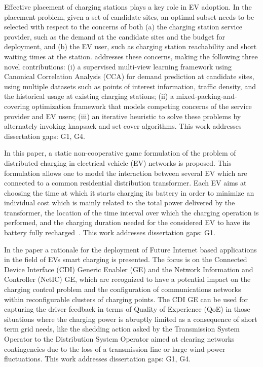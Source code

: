 \documentclass[letterpaper, 12pt, oneside, doublespacing]{Thesis}
\begin{document}
\noindent Effective placement of charging stations plays a key role in EV adoption. In the placement problem, given a set of candidate sites, an optimal subset needs to be selected with respect to the concerns of both (a) the charging station service provider, such as the demand at the candidate sites and the budget for deployment, and (b) the EV user, such as charging station reachability and short waiting times at the station. \cite{demand_prediction_2016} addresses these concerns, making the following three novel contributions: (i) a supervised multi-view learning framework using Canonical Correlation Analysis (CCA) for demand prediction at candidate sites, using multiple datasets such as points of interest information, traffic density, and the historical usage at existing charging stations; (ii) a mixed-packing-and- covering optimization framework that models competing concerns of the service provider and EV users; (iii) an iterative heuristic to solve these problems by alternately invoking knapsack and set cover algorithms. This work addresses dissertation gaps: G1, G4.



\noindent In this paper, a static non-cooperative game formulation of the problem of distributed charging in electrical vehicle (EV) networks is proposed. This formulation allows one to model the interaction between several EV which are connected to a common residential distribution transformer. Each EV aims at choosing the time at which it starts charging its battery in order to minimize an individual cost which is mainly related to the total power delivered by the transformer, the location of the time interval over which the charging operation is performed, and the charging duration needed for the considered EV to have its battery fully recharged~\cite{introducing_decentralized_2015}. This work addresses dissertation gaps: G1.



\noindent In the paper \cite{electric_vehicles_2015} a rationale for the deployment of Future Internet based applications in the field of EVs smart charging is presented. The focus is on the Connected Device Interface (CDI) Generic Enabler (GE) and the Network Information and Controller (NetIC) GE, which are recognized to have a potential impact on the charging control problem and the configuration of communications networks within reconfigurable clusters of charging points. The CDI GE can be used for capturing the driver feedback in terms of Quality of Experience (QoE) in those situations where the charging power is abruptly limited as a consequence of short term grid needs, like the shedding action asked by the Transmission System Operator to the Distribution System Operator aimed at clearing networks contingencies due to the loss of a transmission line or large wind power fluctuations. This work addresses dissertation gaps: G1, G4.
\end{document}
